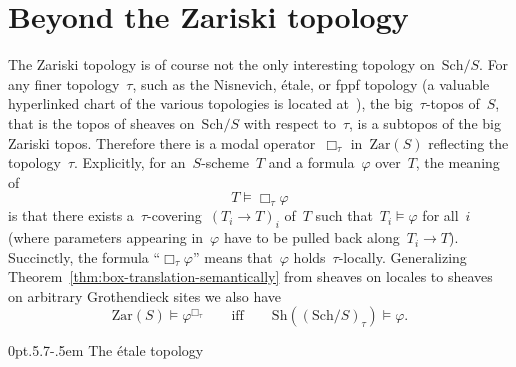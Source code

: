\documentclass[10pt,reqno,a4paper]{amsbook}
\makeatletter
\theoremstyle{definition}
\theoremstyle{plain}
\theoremstyle{remark}
\newcommand{\Sh}{\mathrm{Sh}}
\newcommand{\Zar}{\mathrm{Zar}}
\newcommand{\Sch}{\mathrm{Sch}}
\newcommand{\?}{\,{:}\,}
\renewcommand{\_}{\mathpunct{.}\,}
\def\subsection{\@startsection{subsection}{2}%
  {0pt}{.5\linespacing\@plus.7\linespacing}{-.5em}%
  {\normalfont\bfseries}}
\makeatother
\begin{document}
\section{Beyond the Zariski topology}
\label{sect:beyond-zariski}

The Zariski topology is of course not the only interesting topology
on~$\Sch/S$. For any finer topology~$\tau$, such as the Nisnevich, étale, or fppf
topology (a valuable hyperlinked chart of the various topologies is located
at~\cite{belmans:topologies}), the big~$\tau$-topos of~$S$, that is the topos
of sheaves on~$\Sch/S$ with respect to~$\tau$, is a subtopos
of the big Zariski topos. Therefore there is a modal operator~$\Box_\tau$
in~$\Zar(S)$ reflecting the topology~$\tau$. Explicitly, for an~$S$-scheme~$T$
and a formula~$\varphi$ over~$T$, the meaning of
\[ T \models \Box_\tau \varphi \]
is that there exists a~$\tau$-covering~$(T_i \to T)_i$ of~$T$ such that~$T_i
\models \varphi$ for all~$i$ (where parameters appearing in~$\varphi$ have to
be pulled back along~$T_i \to T$). Succinctly, the formula ``$\Box_\tau
\varphi$'' means that~$\varphi$ holds~$\tau$-locally. Generalizing
Theorem~\ref{thm:box-translation-semantically} from sheaves on locales to
sheaves on arbitrary Grothendieck sites we also have
\[ \Zar(S) \models \varphi^{\Box_\tau} \qquad\text{iff}\qquad
  \Sh((\Sch/S)_\tau) \models \varphi. \]


\subsection{The étale topology}
\end{document}
